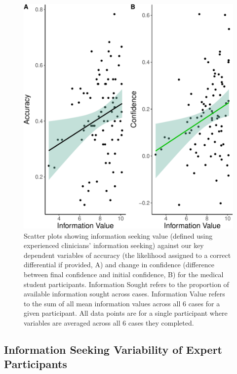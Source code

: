 \documentclass[a4paper, nobind]{templates/ociamthesis}
\begin{document}
\begin{figure}[H]

{\centering \includegraphics[width=1\linewidth]{_main_files/figure-latex/confAccPlotExp-1} 

}

\caption[Online Study Appendix: Expert Information Seeking against Confidnece/Accuracy (Scatter Plots)]{Scatter plots showing information seeking value (defined using experienced clinicians' information seeking) against our key dependent variables of accuracy (the likelihood assigned to a correct differential if provided, A) and change in confidence (difference between final confidence and initial confidence, B) for the medical student participants. Information Sought refers to the proportion of available information sought across cases. Information Value refers to the sum of all mean information values across all 6 cases for a given participant. All data points are for a single participant where variables are averaged across all 6 cases they completed.}\label{fig:confAccPlotExp}
\end{figure}

\subsection{Information Seeking Variability of Expert Participants}\label{information-seeking-variability-of-expert-participants}
\end{document}
